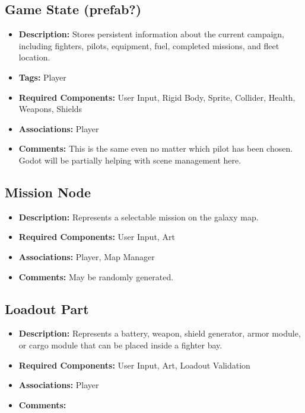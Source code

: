 \documentclass[journal]{IEEEtran}
\begin{document}
\subsection{Game State (prefab?)}

\begin{itemize}
    \item \textbf{Description:} Stores persistent information about the current campaign, including fighters, pilots, equipment, fuel, completed missions, and fleet location.
    \item \textbf{Tags:} Player 
    \item \textbf{Required Components: } User Input, Rigid Body, Sprite, Collider, Health, Weapons, Shields 
    \item \textbf{Associations: } Player
    \item \textbf{Comments: } This is the same even no matter which pilot has been chosen. Godot will be partially helping with scene management here.
\end{itemize}

\subsection{Mission Node}

\begin{itemize}
    \item \textbf{Description:} Represents a selectable mission on the galaxy map.
    \item \textbf{Required Components: } User Input, Art 
    \item \textbf{Associations: } Player, Map Manager
    \item \textbf{Comments: } May be randomly generated.
\end{itemize}

\subsection{Loadout Part}

\begin{itemize}
    \item \textbf{Description:} Represents a battery, weapon, shield generator, armor module, or cargo module that can be placed inside a fighter bay.
    \item \textbf{Required Components: } User Input, Art, Loadout Validation
    \item \textbf{Associations: } Player
    \item \textbf{Comments: } 
\end{itemize}
\end{document}

